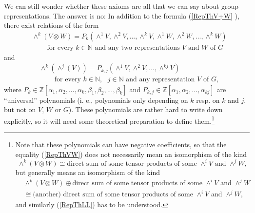 \documentclass[numbers=enddot,12pt,final,onecolumn,notitlepage]{scrartcl}%
\begin{document}
We can still wonder whether these axioms are all that we can say about group
representations. The answer is no: In addition to the formula (\ref{RepThV+W}%
), there exist relations of the form
\begin{align}
&  \wedge^{k}\left(  V\otimes W\right)  =P_{k}\left(  \wedge^{1}V,\wedge
^{2}V,...,\wedge^{k}V,\wedge^{1}W,\wedge^{2}W,...,\wedge^{k}W\right)
\nonumber\\
&  \ \ \ \ \ \ \ \ \ \ \text{for every }k\in\mathbb{N}\text{ and any two
representations }V\text{ and }W\text{ of }G \label{RepThVW}%
\end{align}
and%
\begin{align}
&  \wedge^{k}\left(  \wedge^{j}\left(  V\right)  \right)  =P_{k,j}\left(
\wedge^{1}V,\wedge^{2}V,...,\wedge^{kj}V\right) \nonumber\\
&  \ \ \ \ \ \ \ \ \ \ \text{for every }k\in\mathbb{N},\text{ }j\in
\mathbb{N}\text{ and any representation }V\text{ of }G, \label{RepThLL}%
\end{align}
where $P_{k}\in\mathbb{Z}\left[  \alpha_{1},\alpha_{2},...,\alpha_{k}%
,\beta_{1},\beta_{2},...,\beta_{k}\right]  $ and $P_{k,j}\in\mathbb{Z}\left[
\alpha_{1},\alpha_{2},...,\alpha_{kj}\right]  $ are ``universal'' polynomials
(i. e., polynomials only depending on $k$ resp. on $k$ and $j$, but not on
$V$, $W$ or $G$). These polynomials are rather hard to write down explicitly,
so it will need some theoretical preparation to define them.\footnote{Note
that these polynomials can have negative coefficients, so that the equality
(\ref{RepThVW}) does not necessarily mean an isomorphism of the kind%
\[
\wedge^{k}\left(  V\otimes W\right)  \cong\text{direct sum of some tensor
products of some }\wedge^{i}V\text{ and }\wedge^{j}W,
\]
but generally means an isomorphism of the kind%
\begin{align*}
&  \wedge^{k}\left(  V\otimes W\right)  \oplus\text{direct sum of some tensor
products of some }\wedge^{i}V\text{ and }\wedge^{j}W\\
&  \cong\text{(another) direct sum of some tensor products of some }\wedge
^{i}V\text{ and }\wedge^{j}W,
\end{align*}
and similarly (\ref{RepThLL}) has to be understood.}
\end{document}
